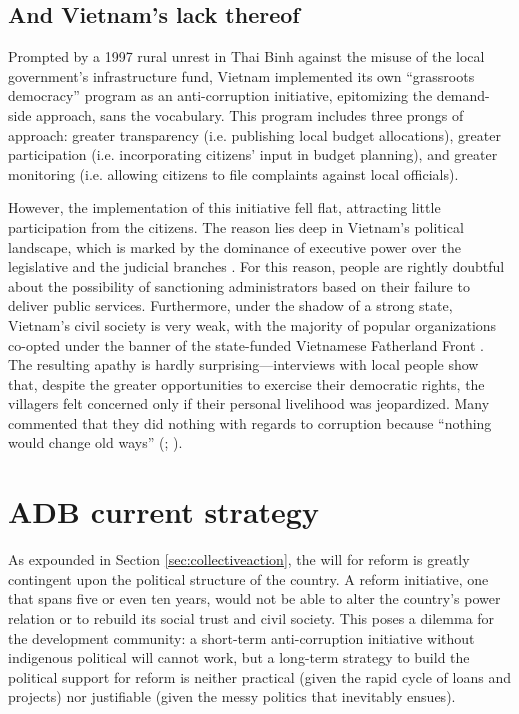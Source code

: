 \documentclass[12pt]{article}
\begin{document}
\subsection{And Vietnam's lack thereof} \label{sec:Vietnam}

Prompted by a 1997 rural unrest in Thai Binh against the misuse of the local government's infrastructure fund, Vietnam implemented its own ``grassroots democracy'' program as an anti-corruption initiative, epitomizing the demand-side approach, sans the vocabulary. This program includes three prongs of approach: greater transparency (i.e. publishing local budget allocations), greater participation (i.e. incorporating citizens' input in budget planning), and greater monitoring (i.e. allowing citizens to file complaints against local officials).

However, the implementation of this initiative fell flat, attracting little participation from the citizens. The reason lies deep in Vietnam's political landscape, which is marked by the dominance of executive power over the legislative and the judicial branches \citep{Vasavakul2002}. For this reason, people are rightly doubtful about the possibility of sanctioning administrators based on their failure to deliver public services. Furthermore, under the shadow of a strong state, Vietnam's civil society is very weak, with the majority of popular organizations co-opted under the banner of the state-funded Vietnamese Fatherland Front \citep[3]{Thayer2009}. The resulting apathy is hardly surprising---interviews with local people show that, despite the greater opportunities to exercise their democratic rights, the villagers felt concerned only if their personal livelihood was jeopardized. Many commented that they did nothing with regards to corruption because ``nothing would change old ways'' (\citealp[28]{Duong2004}; \citealp{Fritzen2005}).

\section{ADB current strategy} \label{sec:currentstrategy}

As expounded in Section \ref{sec:collectiveaction}, the will for reform is greatly contingent upon the political structure of the country. A reform initiative, one that spans five or even ten years, would not be able to alter the country's power relation or to rebuild its social trust and civil society. This poses a dilemma for the development community: a short-term anti-corruption initiative without indigenous political will cannot work, but a long-term strategy to build the political support for reform is neither practical (given the rapid cycle of loans and projects) nor justifiable (given the messy politics that inevitably ensues).
\end{document}
